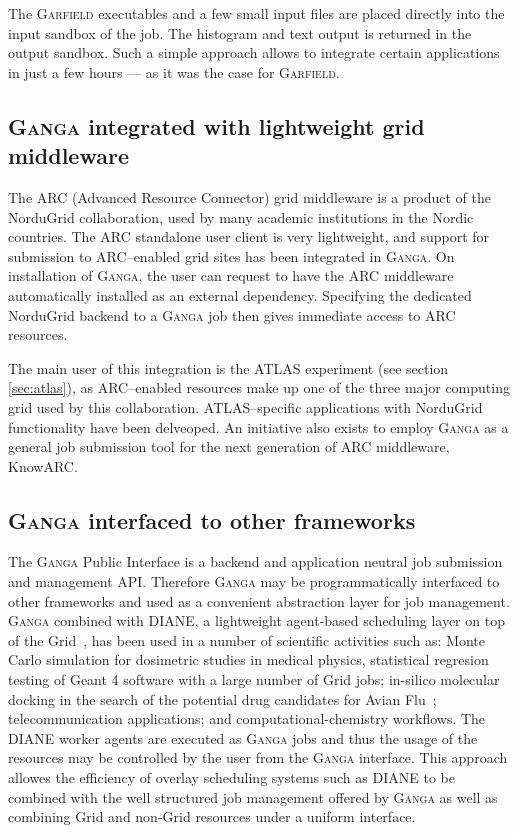 \documentclass{elsart}
\def\atlas {ATLAS\xspace}
\def\ganga {\textsc{Ganga}\xspace}
\def\garfield {\textsc{Garfield}\xspace}
\def\diane {\textsc{DIANE}\xspace}
\def\grid {Grid\xspace}
\begin{document}
The \garfield executables and a few small input files are placed directly into
the input sandbox of the job. The histogram and text output is returned in the
output sandbox. Such a simple approach allows to integrate certain
applications in just a few hours --- as it was the case for \garfield.

\subsection{\ganga integrated with lightweight grid middleware}

The ARC (Advanced Resource Connector) grid middleware\cite{ARC} is a
product of the NorduGrid collaboration\cite{NG}, used by many academic
institutions in the Nordic countries. The ARC standalone user client
is very lightweight, and support for submission to ARC--enabled grid
sites has been integrated in \ganga. On installation of \ganga, the user
can request to have the ARC middleware automatically installed as an
external dependency. Specifying the dedicated NorduGrid backend to a
\ganga job then gives immediate access to ARC resources.

The main user of this integration is the \atlas experiment (see
section \ref{sec:atlas}), as ARC--enabled resources make up one of the
three major computing grid used by this collaboration. ATLAS--specific
applications with NorduGrid functionality have been delveoped. An
initiative also exists to employ \ganga as a general job submission
tool for the next generation of ARC middleware, KnowARC.

\subsection{\ganga interfaced to other frameworks}
\label{sec:GangaInOtherFrameworks}
The \ganga Public Interface is a backend and application neutral job
submission and management API. Therefore \ganga may be programmatically
interfaced to other frameworks and used as a convenient abstraction layer for
job management. \ganga combined with \diane, a lightweight agent-based
scheduling layer on top of the \grid~\cite{DIANE}, has been used in a number
of scientific activities such as: Monte Carlo simulation for dosimetric
studies in medical physics, statistical regresion testing of Geant 4 \cite{Geant4}
software
with a large number of \grid jobs; in-silico molecular docking in the search
of the potential drug candidates for Avian Flu~\cite{AvianFlu};
telecommunication applications; and computational-chemistry workflows. The
\diane worker agents are executed as \ganga jobs and thus the usage of the
resources may be controlled by the user from the \ganga interface. This
approach allowes the efficiency of overlay scheduling systems such
as \diane to be combined with the well structured job management offered by \ganga as well as
combining \grid and non-\grid resources under a uniform interface.
\end{document}
